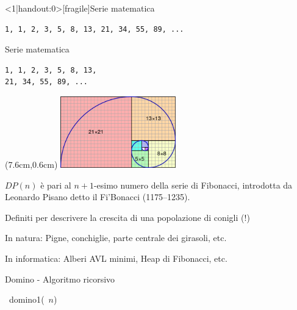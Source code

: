 \begin{frame}<1|handout:0>[fragile]{Serie matematica}

\vspace{-9pt}

\begin{lstlisting}
1, 1, 2, 3, 5, 8, 13, 21, 34, 55, 89, ...
\end{lstlisting}


\end{frame}


\begin{frame}[fragile]{Serie matematica}

\vspace{-9pt}

\begin{lstlisting}
1, 1, 2, 3, 5, 8, 13, 
21, 34, 55, 89, ...
\end{lstlisting}

\begin{textblock*}{5cm}(7.6cm,0.6cm) %
\includegraphics[width=5cm]{fibonacci.png}
\end{textblock*}

\begin{myboxtitle}
$DP(n)$ è pari al $n+1$-esimo numero della serie di Fibonacci, introdotta da Leonardo Pisano detto il Fi'Bonacci (1175--1235).
\end{myboxtitle}

\BIL
\item Definiti per descrivere la crescita di una popolazione di conigli (!)
\item In natura: Pigne, conchiglie, parte centrale dei girasoli, etc.
\item In informatica: Alberi AVL minimi, Heap di Fibonacci, etc.
\EIL

\end{frame}


\begin{frame}[fragile]{Domino - Algoritmo ricorsivo}

\vspace{-9pt}

\begin{Procedure}
\caption[A]{\INTEGER\ \textsf{domino1}(\INTEGER\ $n$)}
\end{Procedure}


\end{frame}

